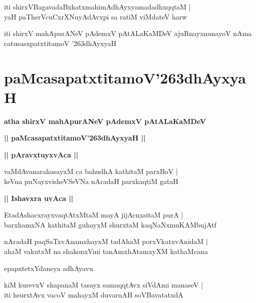 \documentclass[twoside,12pt,openright]{book}
\def\S{\char'263}
\newcounter{shloka}[chapter]
\def\uvaca#1{\centerline{{\large\textbf{#1}}}}
\begin{document}
\begin{shloka}%
iti shirxVBagavadaBxkatxmahimAdhAyxyamadadhxqqtaM |\\
yaH paTherVcuCxrXNuyAdAvxpi sa ratiM viMdateV harw
\end{shloka}

\begin{center}
iti shirxV mahApurANeV pAdemxV pAtALaKaMDeV ajuRnayxnunayoV nAma   
catusasxpatxtitamoV \S dhAyxyaH
\end{center}

\chapter{paMcasapatxtitamoV\S dhAyxyaH}

\begin{center}
{\LARGE\bfseries atha shirxV mahApurANeV pAdemxV pAtALaKaMDeV }
\end{center}

\begin{center}         
{\LARGE\bfseries || paMcasapatxtitamoV\S dhAyxyaH ||}
\end{center}

\uvaca{|| pAravxtuyxvAca ||}

\begin{shloka}%
vaMdAvanarahasayxM ca bahudhA kathitaM parxBoV |\\
keVna puNayxvisheVSeVNa nAradaH parxkaqtiM gataH 
\end{shloka}

\uvaca{|| Ishavxra uvAca ||}

\begin{shloka}%
EtadAshacxrayxvaqtAtxMtaM mayA jijAcnxsitaM purA |\\
barxhamxNA kathitaM guhayxM shurxtaM kaqNaNxmuKAMbujAtf
\end{shloka}

\begin{shloka}%
nAradaH paqSaTxvAnamxhayxM tadAhaM porxVkatxvAnidaM |\\
ahaM vakutxM na shakonxVmi tanAmxhAtamxyXM kathaMcana
\end{shloka}

\begin{center}
epapxtetxYdaneya adhAyavu
\end{center}

\begin{shloka}%
kiM kurevxV shapanaM tasayx samaqqtAvx siVdAmi manaseV |\\
iti hsurxtAvx vacoV mahayxM duvarnAH soVBavatatxdA
\end{shloka}
\end{document}
